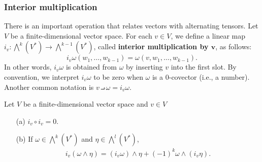 \subsubsection{Interior multiplication}
There is an important operation that relates vectors with alternating tensors. Let $V$ be a finite-dimensional vector space. For each $v\in V$, we define a linear map $i_v:\bigwedge^k(V^*)\to\bigwedge^{k-1}(V^*)$, called \textbf{interior multiplication by $\bm{v}$}, as follows:
\[i_v\omega(w_1,\dots,w_{k-1})=\omega(v,w_1,\dots,w_{k-1}).\]
In other words, $i_v\omega$ is obtained from $\omega$ by inserting $v$ into the first slot. By convention, we interpret $i_v\omega$ to be zero when $\omega$ is a $0$-covector (i.e., a number). Another common notation is $v\intprod\omega=i_v\omega$.
\begin{lemma}\label{interior multiplication lem}
Let $V$ be a finite-dimensional vector space and $v\in V$
\begin{itemize}
\item[(a)] $i_v\circ i_v=0$.
\item[(b)] If $\omega\in\bigwedge^k(V^*)$ and $\eta\in\bigwedge^l(V^*)$,
\begin{align}\label{interior multiplication-1}
i_v(\omega\wedge\eta)=(i_v\omega)\wedge\eta+(-1)^k\omega\wedge(i_v\eta).
\end{align}
\end{itemize} 
\end{lemma}
